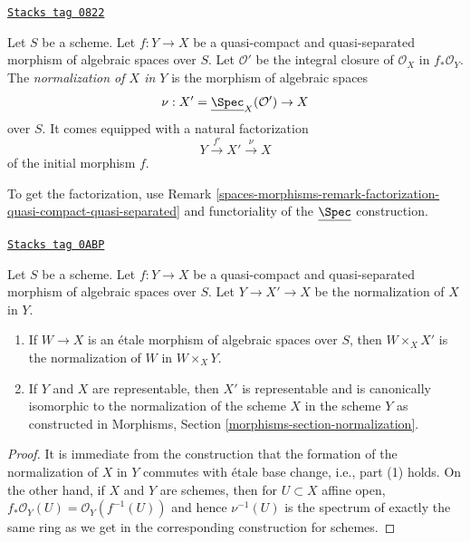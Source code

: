 \begin{definition}[Normalization X in Y]
\label{spaces-morphisms-definition-normalization-X-in-Y}
\href{https://stacks.math.columbia.edu/tag/0822}{\texttt{Stacks tag 0822}}

Let $S$ be a scheme. Let $f : Y \to X$ be a quasi-compact and quasi-separated
morphism of algebraic spaces over $S$. Let $\mathcal{O}'$ be the integral
closure of $\mathcal{O}_X$ in $f_*\mathcal{O}_Y$. The {\it normalization of
$X$ in $Y$} is the morphism of algebraic spaces
$$
\nu : X' = \underline{\Spec}_X(\mathcal{O}') \to X
$$
over $S$. It comes equipped with a natural factorization
$$
Y \xrightarrow{f'} X' \xrightarrow{\nu} X
$$
of the initial morphism $f$.
\end{definition}

To get the factorization, use Remark
\ref{spaces-morphisms-remark-factorization-quasi-compact-quasi-separated}
and functoriality of the $\underline{\Spec}$ construction.

\begin{lemma}
\label{spaces-morphisms-lemma-properties-normalization}
\href{https://stacks.math.columbia.edu/tag/0ABP}{\texttt{Stacks tag 0ABP}}

Let $S$ be a scheme. Let $f : Y \to X$ be a quasi-compact and quasi-separated
morphism of algebraic spaces over $S$. Let $Y \to X' \to X$ be the
normalization of $X$ in $Y$.
\begin{enumerate}
\item If $W \to X$ is an \'etale morphism of algebraic spaces over $S$,
then $W \times_X X'$ is the normalization of $W$ in $W \times_X Y$.
\item If $Y$ and $X$ are representable, then $X'$ is representable
and is canonically isomorphic to the normalization of the scheme $X$
in the scheme $Y$ as constructed in
Morphisms, Section \ref{morphisms-section-normalization}.
\end{enumerate}
\end{lemma}

\begin{proof}
It is immediate from the construction that the formation
of the normalization of $X$ in $Y$ commutes with \'etale
base change, i.e., part (1) holds. On the other hand, if
$X$ and $Y$ are schemes, then for $U \subset X$ affine open,
$f_*\mathcal{O}_Y(U) = \mathcal{O}_Y(f^{-1}(U))$ and hence
$\nu^{-1}(U)$ is the spectrum of exactly the same ring as
we get in the corresponding construction for schemes.
\end{proof}

